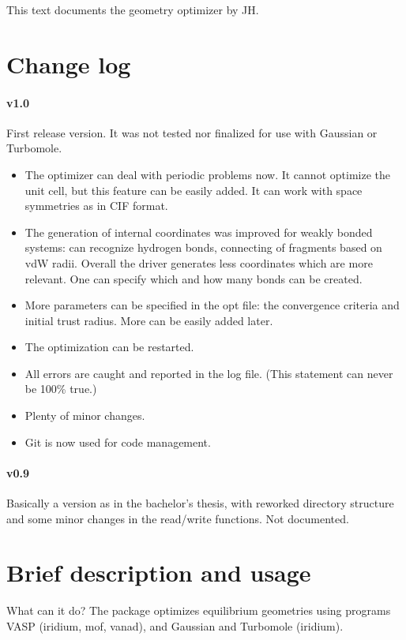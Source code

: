 \documentclass[12pt,a4]{article}
\begin{document}
\noindent This text documents the geometry optimizer by JH.

\section{Change log}

\paragraph{v1.0} First release version. It was not tested nor finalized for use with Gaussian or Turbomole.

\begin{itemize}
\item The optimizer can deal with periodic problems now. It cannot optimize the unit cell, but this feature can be easily added. It can work with space symmetries as in CIF format.
\item The generation of internal coordinates was improved for weakly bonded systems: can recognize hydrogen bonds, connecting of fragments based on vdW radii. Overall the driver generates less coordinates which are more relevant. One can specify which and how many bonds can be created.
\item More parameters can be specified in the opt file: the convergence criteria and initial trust radius. More can be easily added later.
\item The optimization can be restarted.
\item All errors are caught and reported in the log file. (This statement can never be 100\% true.)
\item Plenty of minor changes.
\item Git is now used for code management.
\end{itemize}

\paragraph{v0.9} Basically a version as in the bachelor's thesis, with reworked directory structure and some minor changes in the read/write functions. Not documented.

\section{Brief description and usage}

What can it do? The package optimizes equilibrium geometries using programs VASP (iridium, mof, vanad), and Gaussian and Turbomole (iridium).
\end{document}
